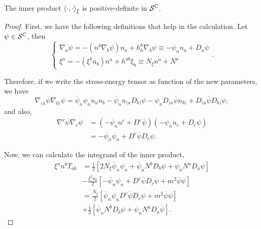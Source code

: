 \begin{proposition}\label{prop:xi-positivo}
    The inner product \(\left\langle \cdot,\cdot\right\rangle_{\xi}\) is positive-definite in \({\mathcal{S}}^{\mathbb{C}}\).
\end{proposition}
\begin{proof}
    First, we have the following definitions that help in the calculation. Let \(\psi\in{\mathcal{S}}^{\mathbb{C}}\), then
    \begin{equation}
        \begin{cases}
            \nabla_a\psi=-(n^b\nabla_b\psi)n_a+h_a^b\nabla_b\psi\equiv-\psi_nn_a+D_a\psi\\
            \xi^a=-(\xi^bn_b)n^a+h^{ab}\xi_b\equiv N_{\xi}n^a+N^a
        \end{cases}.
    \end{equation}

    Therefore, if we write the stress-energy tensor as function of the new parameters, we have
    \begin{equation}
        \nabla_{(a}\overline{\psi}\nabla_{b)}\psi=\overline{\psi}_n\psi_nn_an_b-\overline{\psi}_nn_{(a}D_{b)}\psi-\psi_nD_{(a}\overline{\psi}n_{b)}+D_{(a}\overline{\psi}D_{b)}\psi,
    \end{equation}
    and also,
    \begin{subequations}
        \begin{align}
            \nabla^c\overline{\psi}\nabla_c\psi&=\left(-\overline{\psi}_nn^c+D^c\overline{\psi}\right)\left(-\psi_nn_c+D_c\psi\right)\\
            &=-\overline{\psi_n}\psi_n+D^c\overline{\psi}D_c\psi.
        \end{align}
    \end{subequations}

    Now, we can calculate the integrand of the inner product,
    \begin{subequations}
        \begin{align}
            \xi^an^bT_{ab}&=\frac{1}{2}\left[2N_\xi\overline{\psi}_n\psi_n+\overline{\psi}_nN^bD_b\psi+\psi_nN^aD_a\psi\right]\\
            &-\frac{\xi^bn_b}{2}\left[-\overline{\psi}_n\psi_n+D^c\overline{\psi}D_c\psi+m^2\overline{\psi}\psi\right]\\
            &=\frac{N_\xi}{2}\left[\overline{\psi}_n\psi_n D^c\overline{\psi}D_c\psi+m^2\overline{\psi}\psi\right]\\
            &+\frac{1}{2}\left[\overline{\psi}_nN^bD_b\psi+\psi_nN^aD_a\overline{\psi}\right].
        \end{align}
    \end{subequations}


\end{proof}
